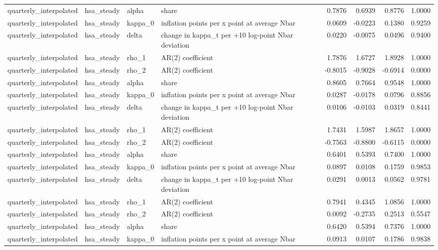 \begin{tabular}{llllrrrr}
quarterly\_interpolated & hsa\_steady & alpha & share & 0.7876 & 0.6939 & 0.8776 & 1.0000 \\
quarterly\_interpolated & hsa\_steady & kappa\_0 & inflation points per x point at average Nbar & 0.0609 & -0.0223 & 0.1380 & 0.9259 \\
quarterly\_interpolated & hsa\_steady & delta & change in kappa\_t per +10 log-point Nbar deviation & 0.0220 & -0.0075 & 0.0496 & 0.9400 \\
quarterly\_interpolated & hsa\_steady & rho\_1 & AR(2) coefficient & 1.7876 & 1.6727 & 1.8928 & 1.0000 \\
quarterly\_interpolated & hsa\_steady & rho\_2 & AR(2) coefficient & -0.8015 & -0.9028 & -0.6914 & 0.0000 \\
quarterly\_interpolated & hsa\_steady & alpha & share & 0.8605 & 0.7664 & 0.9548 & 1.0000 \\
quarterly\_interpolated & hsa\_steady & kappa\_0 & inflation points per x point at average Nbar & 0.0287 & -0.0178 & 0.0796 & 0.8856 \\
quarterly\_interpolated & hsa\_steady & delta & change in kappa\_t per +10 log-point Nbar deviation & 0.0106 & -0.0103 & 0.0319 & 0.8441 \\
quarterly\_interpolated & hsa\_steady & rho\_1 & AR(2) coefficient & 1.7431 & 1.5987 & 1.8657 & 1.0000 \\
quarterly\_interpolated & hsa\_steady & rho\_2 & AR(2) coefficient & -0.7563 & -0.8800 & -0.6115 & 0.0000 \\
quarterly\_interpolated & hsa\_steady & alpha & share & 0.6401 & 0.5393 & 0.7400 & 1.0000 \\
quarterly\_interpolated & hsa\_steady & kappa\_0 & inflation points per x point at average Nbar & 0.0897 & 0.0108 & 0.1759 & 0.9853 \\
quarterly\_interpolated & hsa\_steady & delta & change in kappa\_t per +10 log-point Nbar deviation & 0.0291 & 0.0013 & 0.0562 & 0.9781 \\
quarterly\_interpolated & hsa\_steady & rho\_1 & AR(2) coefficient & 0.7941 & 0.4345 & 1.0856 & 1.0000 \\
quarterly\_interpolated & hsa\_steady & rho\_2 & AR(2) coefficient & 0.0092 & -0.2735 & 0.2513 & 0.5547 \\
quarterly\_interpolated & hsa\_steady & alpha & share & 0.6420 & 0.5394 & 0.7376 & 1.0000 \\
quarterly\_interpolated & hsa\_steady & kappa\_0 & inflation points per x point at average Nbar & 0.0913 & 0.0107 & 0.1786 & 0.9838 \\

\end{tabular}
